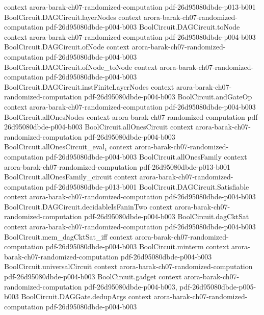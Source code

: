 \begin{theorem}
  {context}
  {arora-barak-ch07-randomized-computation}
  {pdf-26d95080dbde-p013-b001}
\proofstep
  {BoolCircuit.DAGCircuit.layerNodes}
  {context}
  {arora-barak-ch07-randomized-computation}
  {pdf-26d95080dbde-p004-b003}
\proofstep
  {BoolCircuit.DAGCircuit.toNode}
  {context}
  {arora-barak-ch07-randomized-computation}
  {pdf-26d95080dbde-p004-b003}
\proofstep
  {BoolCircuit.DAGCircuit.ofNode}
  {context}
  {arora-barak-ch07-randomized-computation}
  {pdf-26d95080dbde-p004-b003}
\proofstep
  {BoolCircuit.DAGCircuit.ofNode_toNode}
  {context}
  {arora-barak-ch07-randomized-computation}
  {pdf-26d95080dbde-p004-b003}
\proofstep
  {BoolCircuit.DAGCircuit.instFiniteLayerNodes}
  {context}
  {arora-barak-ch07-randomized-computation}
  {pdf-26d95080dbde-p004-b003}
\proofstep
  {BoolCircuit.andGateOp}
  {context}
  {arora-barak-ch07-randomized-computation}
  {pdf-26d95080dbde-p004-b003}
\proofstep
  {BoolCircuit.allOnesNodes}
  {context}
  {arora-barak-ch07-randomized-computation}
  {pdf-26d95080dbde-p004-b003}
\proofstep
  {BoolCircuit.allOnesCircuit}
  {context}
  {arora-barak-ch07-randomized-computation}
  {pdf-26d95080dbde-p004-b003}
\proofstep
  {BoolCircuit.allOnesCircuit_eval₁}
  {context}
  {arora-barak-ch07-randomized-computation}
  {pdf-26d95080dbde-p004-b003}
\proofstep
  {BoolCircuit.allOnesFamily}
  {context}
  {arora-barak-ch07-randomized-computation}
  {pdf-26d95080dbde-p013-b001}
\proofstep
  {BoolCircuit.allOnesFamily_circuit}
  {context}
  {arora-barak-ch07-randomized-computation}
  {pdf-26d95080dbde-p013-b001}
\proofstep
  {BoolCircuit.DAGCircuit.Satisfiable}
  {context}
  {arora-barak-ch07-randomized-computation}
  {pdf-26d95080dbde-p004-b003}
\proofstep
  {BoolCircuit.DAGCircuit.decidableIsFaninTwo}
  {context}
  {arora-barak-ch07-randomized-computation}
  {pdf-26d95080dbde-p004-b003}
\proofstep
  {BoolCircuit.dagCktSat}
  {context}
  {arora-barak-ch07-randomized-computation}
  {pdf-26d95080dbde-p004-b003}
\proofstep
  {BoolCircuit.mem_dagCktSat_iff}
  {context}
  {arora-barak-ch07-randomized-computation}
  {pdf-26d95080dbde-p004-b003}
\proofstep
  {BoolCircuit.minterm}
  {context}
  {arora-barak-ch07-randomized-computation}
  {pdf-26d95080dbde-p004-b003}
\proofstep
  {BoolCircuit.universalCircuit}
  {context}
  {arora-barak-ch07-randomized-computation}
  {pdf-26d95080dbde-p004-b003}
\proofstep
  {BoolCircuit.gadget}
  {context}
  {arora-barak-ch07-randomized-computation}
  {pdf-26d95080dbde-p004-b003,
    pdf-26d95080dbde-p005-b003}
\proofstep
  {BoolCircuit.DAGGate.dedupArgs}
  {context}
  {arora-barak-ch07-randomized-computation}
  {pdf-26d95080dbde-p004-b003}

\end{theorem}
